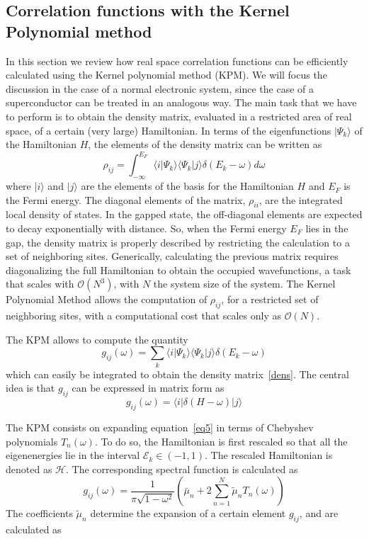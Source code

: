 \subsection{Correlation functions with the Kernel Polynomial method}
\label{sec:KPM}
In this section we review how real space correlation functions can be
efficiently calculated using the Kernel polynomial method
(KPM).\cite{RevModPhys.78.275}
We will focus the discussion in the case of a normal electronic system,
since the case of a superconductor can be treated in an analogous way.
The main task that we have to perform is to obtain the density matrix, evaluated
in a restricted area of real space, of a certain (very large) Hamiltonian. In
terms of the eigenfunctions $|\Psi_k\rangle$ of the Hamiltonian $H$,
the elements of the density
matrix can be written as
\begin{equation}
\rho_{ij} = \int_{-\infty}^{E_F} \langle i | \Psi_k \rangle \langle \Psi_k | j\rangle\delta(E_k -\omega) d\omega
\label{dens}
\end{equation}
where $|i\rangle$ and $|j\rangle$ are the elements of the basis for the
Hamiltonian $H$ and $E_F$ is the Fermi energy.
The diagonal elements of the matrix, $\rho_{ii}$, are the integrated local
density of
states.
In the gapped state, the off-diagonal elements are expected to decay
exponentially with distance. So, when the Fermi energy $E_F$ lies in the gap,
the density matrix is properly described by restricting the calculation to a set
of neighboring sites.
Generically, calculating the previous matrix requires diagonalizing the full
Hamiltonian to obtain the occupied wavefunctions, a task that scales with
$\mathcal{O}(N^3)$, with $N$ the system size of the system.
The Kernel Polynomial Method allows the computation of $\rho_{ij}$, for a
restricted set of neighboring sites, with a computational cost that scales only
as $\mathcal{O}(N)$.

The KPM allows to compute the quantity
\begin{equation}
g_{ij}(\omega) = \sum_k \langle i | \Psi_k \rangle \langle \Psi_k | j\rangle\delta(E_k -\omega)
\end{equation}
which can easily be integrated to obtain the density matrix~\eqref{dens}. The
central idea is that $g_{ij}$ can be expressed in matrix form as
\begin{equation}
g_{ij}(\omega) =
\langle i | \delta (H-\omega) | j \rangle
\label{eq5}
\end{equation}

The KPM consists on expanding equation~\eqref{eq5} in terms of Chebyshev
polynomials $T_n(\omega)$. To do so, the Hamiltonian is first rescaled so that
all the eigenenergies lie in the interval $\mathcal{E}_k \in (-1,1)$. The
rescaled Hamiltonian is denoted as $\mathcal{H}$. The corresponding spectral
function is calculated as
\begin{equation}
g_{ij}({\omega}) = \frac{1}{\pi \sqrt{1-\omega^2}}
\left (\bar \mu_n + 2 \sum^N_{n=1} \tilde \mu_n T_n (\omega)
\right )
\label{KPM}
\end{equation}
The coefficients $\tilde \mu_n$ determine the expansion of a certain element
$g_{ij}$, and are calculated as


